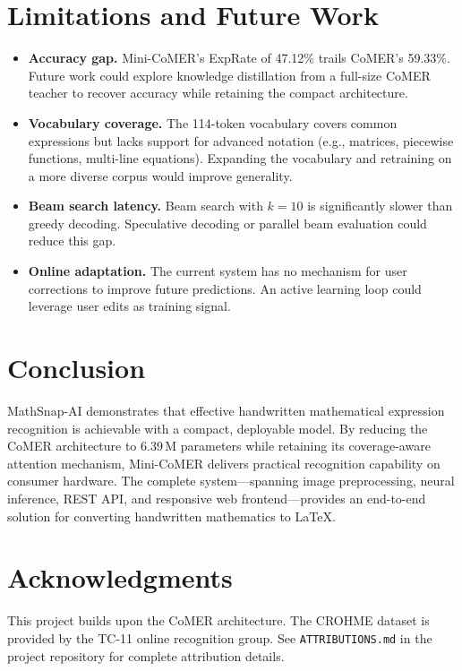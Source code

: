 \documentclass[11pt,a4paper]{article}
\begin{document}
\section{Limitations and Future Work}
\label{sec:limitations}

\begin{itemize}[nosep]
  \item \textbf{Accuracy gap.} Mini-CoMER's ExpRate of 47.12\% trails CoMER's 59.33\%. Future work could explore knowledge distillation from a full-size CoMER teacher to recover accuracy while retaining the compact architecture.
  \item \textbf{Vocabulary coverage.} The 114-token vocabulary covers common expressions but lacks support for advanced notation (e.g., matrices, piecewise functions, multi-line equations). Expanding the vocabulary and retraining on a more diverse corpus would improve generality.
  \item \textbf{Beam search latency.} Beam search with $k{=}10$ is significantly slower than greedy decoding. Speculative decoding or parallel beam evaluation could reduce this gap.
  \item \textbf{Online adaptation.} The current system has no mechanism for user corrections to improve future predictions. An active learning loop could leverage user edits as training signal.
\end{itemize}

\section{Conclusion}
\label{sec:conclusion}

MathSnap-AI demonstrates that effective handwritten mathematical expression recognition is achievable with a compact, deployable model. By reducing the CoMER architecture to 6.39\,M parameters while retaining its coverage-aware attention mechanism, Mini-CoMER delivers practical recognition capability on consumer hardware. The complete system---spanning image preprocessing, neural inference, REST API, and responsive web frontend---provides an end-to-end solution for converting handwritten mathematics to \LaTeX{}.

\section*{Acknowledgments}

This project builds upon the CoMER architecture. The CROHME dataset is provided by the TC-11 online recognition group. See \texttt{ATTRIBUTIONS.md} in the project repository for complete attribution details.
\end{document}

